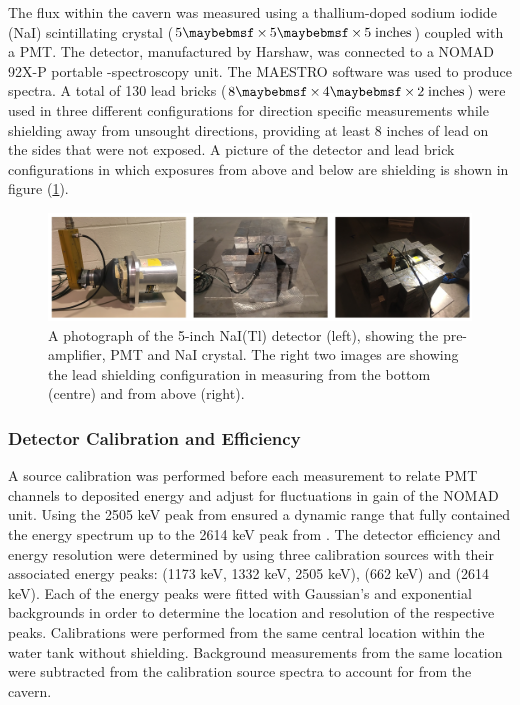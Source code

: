 The \gray{} flux within the cavern was measured using a thallium-doped sodium iodide (NaI) scintillating crystal ($5 \times 5 \times 5 \; \MathText{inches}$) coupled with a PMT. The detector, manufactured by Harshaw, was connected to a NOMAD 92X-P portable \gray{}-spectroscopy unit. The MAESTRO software was used to produce spectra. A total of 130 lead bricks ($8 \times 4 \times 2 \; \MathText{inches}$) were used in three different configurations for direction specific measurements while shielding away \grays{} from unsought directions, providing at least 8 inches of lead on the sides that were not exposed. A picture of the detector and lead brick configurations in which exposures from above and below are shielding is shown in figure (\ref{fig:detector_and_shielding}).
%
\begin{figure}[]
    \centering
    \includegraphics[scale=0.75]{Chapter_3/Figures/Davis_detector_shielding.png}
    \caption[Diagram of the NaI(Tl) crystal detector and the lead shielding used in taking direction specific measurements.]
    {A photograph of the 5-inch NaI(Tl) detector (left), showing the pre-amplifier, PMT and NaI crystal. The right two images are showing the lead shielding configuration in measuring \grays{} from the bottom (centre) and from above (right).}
    \label{fig:detector_and_shielding}
\end{figure}
%

\subsubsection{Detector Calibration and Efficiency}
\label{secsec:calibration_efficiency}


A \CoSZ{} source calibration was performed before each measurement to relate PMT channels to deposited energy and adjust for fluctuations in gain of the NOMAD unit.
Using the 2505 keV peak from \CoSZ{} ensured a dynamic range that fully contained the energy spectrum up to the 2614 keV peak from \TlTZE{}. The detector efficiency and energy resolution were determined by using three calibration sources with their associated energy peaks: \CoSZ{} (1173 keV, 1332 keV, 2505 keV), \CsOTS{} (662 keV) and \TlTZE{} (2614 keV). Each of the energy peaks were fitted with Gaussian's and exponential backgrounds in order to determine the location and resolution of the respective peaks. Calibrations were performed from the same central location within the water tank without shielding. Background measurements from the same location were subtracted from the calibration source spectra to account for \grays{} from the cavern. 

